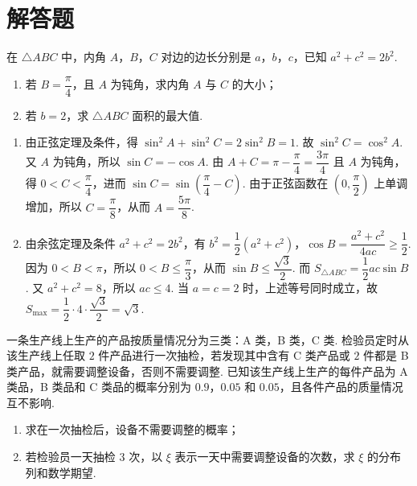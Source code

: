 \section{解答题}

\begin{problem}
在 \(\triangle ABC\) 中，内角 \(A\)，\(B\)，\(C\) 对边的边长分别是 \(a\)，\(b\)，\(c\)，已知 \(a^2+c^2=2b^2\).

\begin{enumerate}
\item 若 \(B=\dfrac{\pi}{4}\)，且 \(A\) 为钝角，求内角 \(A\) 与 \(C\) 的大小；
\item 若 \(b=2\)，求 \(\triangle ABC\) 面积的最大值.
\end{enumerate}
\end{problem}

\begin{solution}
\begin{enumerate}
\item 由正弦定理及条件，得 \(\sin^2A+\sin^2C=2\sin^2B=1\). 故 \(\sin^2C=\cos^2A\). 又 \(A\) 为钝角，所以 \(\sin C=-\cos A\). 由 \(A+C=\pi-\dfrac{\pi}{4}=\dfrac{3\pi}{4}\) 且 \(A\) 为钝角，得 \(0<C<\dfrac{\pi}{4}\)，进而
\(\sin C=\sin\!\left(\dfrac{\pi}{4}-C\right)\). 由于正弦函数在 \(\left(0,\dfrac{\pi}{2}\right)\) 上单调增加，所以 \(C=\dfrac{\pi}{8}\)，从而 \(A=\dfrac{5\pi}{8}\).

\item 由余弦定理及条件 \(a^2+c^2=2b^2\)，有
\(b^2=\dfrac12(a^2+c^2)\)，\(\cos B=\dfrac{a^2+c^2}{4ac}\ge\dfrac12\). 因为 \(0<B<\pi\)，所以 \(0<B\le\dfrac\pi3\)，从而 \(\sin B\le\dfrac{\sqrt3}{2}\). 而 \(S_{\triangle ABC}=\dfrac12ac\sin B\). 又 \(a^2+c^2=8\)，所以 \(ac\le4\). 当 \(a=c=2\) 时，上述等号同时成立，故 \(S_{\max}=\dfrac12\cdot4\cdot\dfrac{\sqrt3}{2}=\sqrt3\).
\end{enumerate}
\end{solution}

\begin{problem}
一条生产线上生产的产品按质量情况分为三类：A 类，B 类，C 类. 检验员定时从该生产线上任取 \(2\) 件产品进行一次抽检，若发现其中含有 C 类产品或 \(2\) 件都是 B 类产品，就需要调整设备，否则不需要调整. 已知该生产线上生产的每件产品为 A 类品，B 类品和 C 类品的概率分别为 \(0.9\)，\(0.05\) 和 \(0.05\)，且各件产品的质量情况互不影响.

\begin{enumerate}
\item 求在一次抽检后，设备不需要调整的概率；
\item 若检验员一天抽检 \(3\) 次，以 \(\xi\) 表示一天中需要调整设备的次数，求 \(\xi\) 的分布列和数学期望.
\end{enumerate}
\end{problem}


